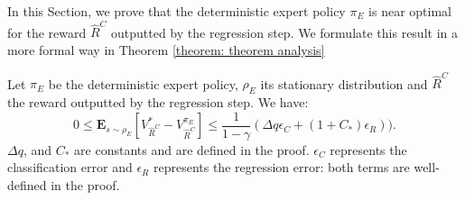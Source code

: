 \documentclass[smallextended]{svjour3}
\newcommand{\E}{\mathbf{E}}
\begin{document}
In this Section, we prove that the deterministic expert policy $\pi_E$ is near optimal for the reward $\hat{R}^C$ outputted by the regression step. We formulate this result in a more formal way in Theorem \ref{theorem: theorem analysis}

\begin{theorem}
\label{theorem: theorem analysis}
Let $\pi_E$ be the deterministic expert policy, $\rho_E$ its stationary distribution and $\hat{R}^C$ the reward outputted by the regression step. We have:
\begin{equation}
0\leq\E_{s\sim\rho_E}[V^*_{\hat{R}^C}-V^{\pi_E}_{\hat{R}^C}]\leq \frac{1}{1-\gamma}(\Delta q \epsilon_C+(1+C_*)\epsilon_R)).
\end{equation}
$\Delta q$, and $C_*$ are constants and are defined in the proof. $\epsilon_C$ represents the classification error and $\epsilon_R$ represents the regression error: both terms are well-defined in the proof.
\end{theorem}
\end{document}
